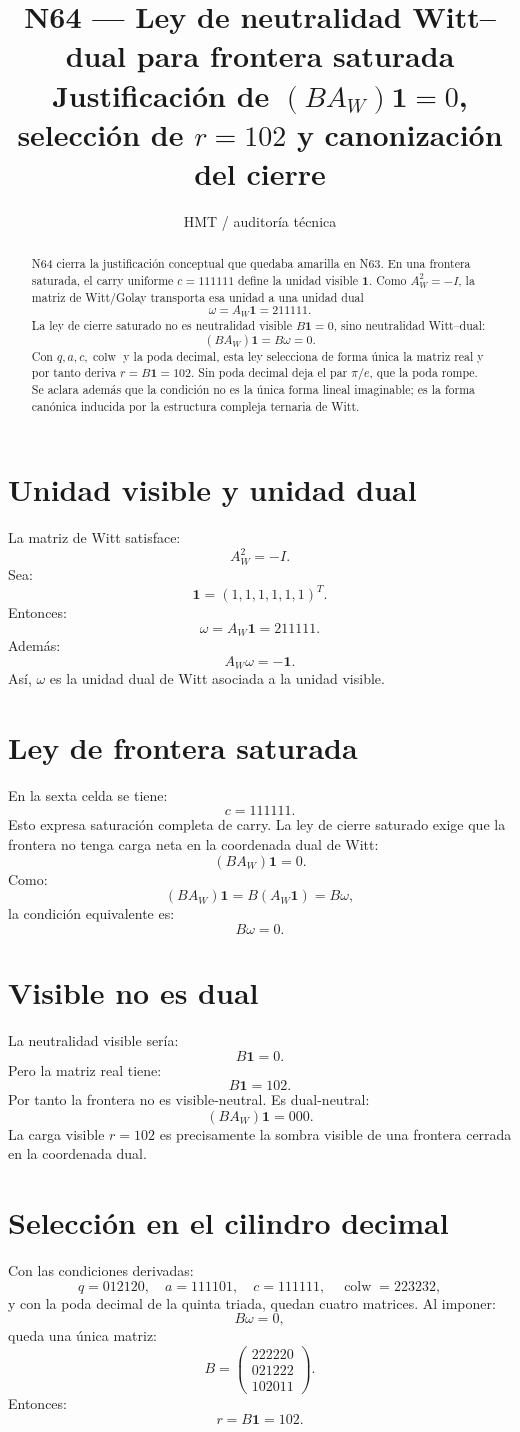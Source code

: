 \documentclass[11pt,a4paper]{article}
\title{\bfseries N64 --- Ley de neutralidad Witt--dual para frontera saturada\\
\large Justificación de \((BA_W)\mathbf1=0\), selección de \(r=102\) y canonización del cierre}
\author{HMT / auditoría técnica}
\date{}
\begin{document}
\maketitle
\begin{abstract}
N64 cierra la justificación conceptual que quedaba amarilla en N63. En una frontera saturada, el carry uniforme \(c=111111\) define la unidad visible \(\mathbf1\). Como \(A_W^2=-I\), la matriz de Witt/Golay transporta esa unidad a una unidad dual
\[
\omega=A_W\mathbf1=211111.
\]
La ley de cierre saturado no es neutralidad visible \(B\mathbf1=0\), sino neutralidad Witt--dual:
\[
\boxed{(BA_W)\mathbf1=B\omega=0.}
\]
Con \(q,a,c,\operatorname{colw}\) y la poda decimal, esta ley selecciona de forma única la matriz real y por tanto deriva \(r=B\mathbf1=102\). Sin poda decimal deja el par \(\pi/e\), que la poda rompe. Se aclara además que la condición no es la única forma lineal imaginable; es la forma canónica inducida por la estructura compleja ternaria de Witt.
\end{abstract}
\section{Unidad visible y unidad dual}
La matriz de Witt satisface:
\[
A_W^2=-I.
\]
Sea:
\[
\mathbf1=(1,1,1,1,1,1)^T.
\]
Entonces:
\[
\boxed{\omega=A_W\mathbf1=211111.}
\]
Además:
\[
A_W\omega=-\mathbf1.
\]
Así, \(\omega\) es la unidad dual de Witt asociada a la unidad visible.
\section{Ley de frontera saturada}
En la sexta celda se tiene:
\[
c=111111.
\]
Esto expresa saturación completa de carry. La ley de cierre saturado exige que la frontera no tenga carga neta en la coordenada dual de Witt:
\[
\boxed{(BA_W)\mathbf1=0.}
\]
Como:
\[
(BA_W)\mathbf1=B(A_W\mathbf1)=B\omega,
\]
la condición equivalente es:
\[
\boxed{B\omega=0.}
\]
\section{Visible no es dual}
La neutralidad visible sería:
\[
B\mathbf1=0.
\]
Pero la matriz real tiene:
\[
B\mathbf1=102.
\]
Por tanto la frontera no es visible-neutral. Es dual-neutral:
\[
(BA_W)\mathbf1=000.
\]
La carga visible \(r=102\) es precisamente la sombra visible de una frontera cerrada en la coordenada dual.
\section{Selección en el cilindro decimal}
Con las condiciones derivadas:
\[
q=012120,\quad a=111101,\quad c=111111,\quad \operatorname{colw}=223232,
\]
y con la poda decimal de la quinta triada, quedan cuatro matrices. Al imponer:
\[
B\omega=0,
\]
queda una única matriz:
\[
\boxed{
B=
\begin{pmatrix}
222220\\
021222\\
102011
\end{pmatrix}.
}
\]
Entonces:
\[
\boxed{r=B\mathbf1=102.}
\]
\end{document}
